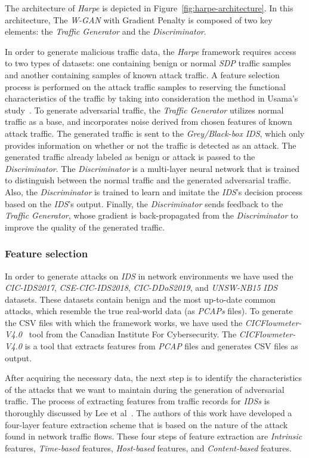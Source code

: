 The architecture of \textit{Harpe} is depicted in Figure~\ref{fig:harpe-architecture}.
In this architecture, The \textit{W-GAN} with Gradient Penalty is composed of two key elements: the
\textit{Traffic Generator} and the \textit{Discriminator}.

In order to generate malicious traffic data, the \textit{Harpe} framework requires access to two types of datasets: one
containing benign or normal \textit{SDP} traffic samples and another containing samples of known attack traffic.
A feature selection process is performed on the attack traffic samples to reserving the functional characteristics of
the traffic by taking into consideration the method in Usama’s study~\cite{usama2019generative}.
To generate adversarial traffic, the \textit{Traffic Generator} utilizes normal traffic as a base, and incorporates
noise derived from chosen features of known attack traffic.
The generated traffic is sent to the \textit{Grey/Black-box} \textit{IDS}, which only provides information on whether
or not the traffic is detected as an attack.
The generated traffic already labeled as benign or attack is passed to the \textit{Discriminator}.
The \textit{Discriminator} is a multi-layer neural network that is trained to distinguish between the normal traffic
and the generated adversarial traffic.
Also, the \textit{Discriminator} is trained to learn and imitate the \textit{IDS}’s decision process based on the
\textit{IDS}’s output.
Finally, the \textit{Discriminator} sends feedback to the \textit{Traffic Generator}, whose gradient is back-propagated
from the \textit{Discriminator} to improve the quality of the generated traffic.

\subsubsection{Feature selection}
In order to generate attacks on \textit{IDS} in network environments we have used the \textit{CIC-IDS2017},
\textit{CSE-CIC-IDS2018}, \textit{CIC-DDoS2019}, and \textit{UNSW-NB15} \textit{IDS} datasets.
These datasets contain benign and the most up-to-date common attacks, which resemble the true real-world data
(as \textit{PCAPs} files).
To generate the CSV files with which the framework works, we have used the
\textit{CICFlowmeter-V4.0}~\cite{lashkari2017cicflowmeter} tool from the Canadian Institute For Cybersecurity.
The \textit{CICFlowmeter-V4.0} is a tool that extracts features from \textit{PCAP} files and generates CSV files
as output.

After acquiring the necessary data, the next step is to identify the characteristics of the attacks that we want to
maintain during the generation of adversarial traffic.
The process of extracting features from traffic records for \textit{IDSs} is thoroughly discussed
by Lee et al~\cite{lee2000framework}.
The authors of this work have developed a four-layer feature extraction scheme that is based on the nature of the
attack found in network traffic flows.
These four steps of feature extraction are \textit{Intrinsic} features, \textit{Time-based} features,
\textit{Host-based} features, and \textit{Content-based} features.

